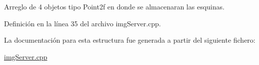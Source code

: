 Arreglo de 4 objetos tipo Point2f en donde se almacenaran las esquinas. 



Definición en la línea 35 del archivo img\+Server.\+cpp.



La documentación para esta estructura fue generada a partir del siguiente fichero\+:\begin{DoxyCompactItemize}
\item 
\hyperlink{imgServer_8cpp}{img\+Server.\+cpp}\end{DoxyCompactItemize}
